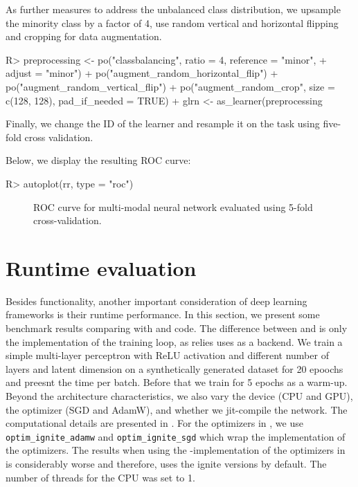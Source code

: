 \documentclass[article]{jss}
\theoremstyle{definition}
\begin{document}
As further measures to address the unbalanced class distribution, we upsample the minority class by a factor of 4, use random vertical and horizontal flipping and cropping for data augmentation.

\begin{CodeInput}
R> preprocessing <- po("classbalancing", ratio = 4, reference = "minor",
+      adjust = "minor") %
+    po("augment_random_horizontal_flip") %
+    po("augment_random_vertical_flip") %
+    po("augment_random_crop", size = c(128, 128), pad_if_needed = TRUE)
+  glrn <- as_learner(preprocessing %
\end{CodeInput}

Finally, we change the ID of the learner and resample it on the task using five-fold cross validation.


Below, we display the resulting ROC curve:

\begin{CodeInput}
R> autoplot(rr, type = "roc")
\end{CodeInput}
\begin{figure}[H]
    \centering
    \caption{ROC curve for multi-modal neural network evaluated using 5-fold cross-validation.}
    \label{fig:roc-curve}
\end{figure}


\section{Runtime evaluation}\label{sec:benchmarks}

Besides functionality, another important consideration of deep learning frameworks is their runtime performance.
In this section, we present some benchmark results comparing \mlrttorch{} with \torch{} and \pytorch{} code.
The difference between \mlrttorch{} and \torch{} is only the implementation of the training loop, as \mlrttorch{} relies uses \torch{} as a backend.
We train a simple multi-layer perceptron with ReLU activation and different number of layers and latent dimension on a synthetically generated dataset for 20 epoochs and preesnt the time per batch.
Before that we train for 5 epochs as a warm-up.
Beyond the architecture characteristics, we also vary the device (CPU and GPU), the optimizer (SGD and AdamW), and whether we jit-compile the network.
The computational details are presented in .
For the optimizers in \rlang{}, we use \texttt{optim\_ignite\_adamw} and \texttt{optim\_ignite\_sgd} which wrap the \libtorch{} implementation of the optimizers.
The results when using the \rlang{}-implementation of the optimizers in \torch{} is considerably worse and therefore, \mlrttorch{} uses the ignite versions by default.
The number of threads for the CPU was set to 1.
\end{document}
